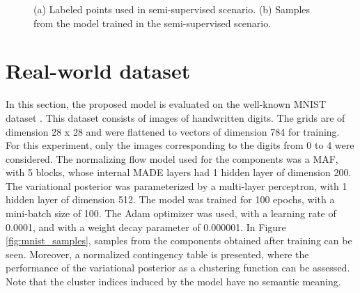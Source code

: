 \begin{figure}[!htb]
  \begin{subfigmatrix}{2}
  \end{subfigmatrix}
    \caption{(a) Labeled points used in semi-supervised scenario. (b) Samples
    from the model trained in the semi-supervised scenario.}
\label{fig:twocircles-semisup}
\end{figure}

\section{Real-world dataset}
In this section, the proposed model is evaluated on the well-known MNIST
dataset \autocite{MNIST}. This dataset consists of images of handwritten digits.
The grids are of dimension 28 x 28 and were flattened to vectors of dimension 784
for training. For this experiment, only the images corresponding to the digits
from 0 to 4 were considered. The normalizing flow model used for the components
was a MAF, with 5 blocks, whose internal MADE layers had 1 hidden layer of dimension
200. The variational posterior was parameterized by a multi-layer perceptron, with
1 hidden layer of dimension 512. The model was trained for 100 epochs, with a mini-batch
size of 100. The Adam optimizer was used, with a learning rate of 0.0001, and with
a weight decay parameter of 0.000001. In Figure \ref{fig:mnist_samples}, samples
from the components obtained after training can be seen. Moreover, a normalized
contingency table is presented, where the performance of the variational posterior
as a clustering function can be assessed. Note that the cluster indices induced
by the model have no semantic meaning.

